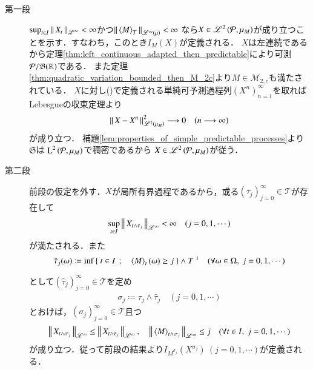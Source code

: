 	\begin{prf}\mbox{}
		\begin{description}
			\item[第一段] $\operatorname*{sup}_{t \in I} \left\|\, X_t\, \right\|_{\mathscr{L}^\infty} < \infty$かつ$\Norm{\inprod<M>_T}{\semiLp{\infty}{\mu}} < \infty$
				なら$X \in \mathscr{L}^{2} \left(\mathcal{P},\mu_M\right)$が成り立つことを示す．すなわち，このとき$I_M(X)$が定義される．
				$X$は左連続であるから定理\ref{thm:left_continuous_adapted_then_predictable}により可測$\mathcal{P}/\mathfrak{B}(\mathbb{R})$である．
				また定理\ref{thm:quadratic_variation_bounded_then_M_2c}より$M \in \mathcal{M}_{2,c}$も満たされている．
				$X$に対し()で定義される単純可予測過程列$(X^n)_{n=1}^{\infty}$を取れば
				Lebesgueの収束定理より
				\begin{align}
					\left\|\, X - X^n\, \right\|_{\mathscr{L}^{2} \left(\mu_M\right)}^2 \longrightarrow 0 
					\quad (n \longrightarrow \infty)
				\end{align}
				が成り立つ．
				補題\ref{lem:properties_of_simple_predictable_processes}より$\mathfrak{S}$は
				$\operatorname{L}^{2} \left(\mathcal{P},\mu_M\right)$で稠密であるから
				$X \in \mathscr{L}^{2} \left(\mathcal{P},\mu_M\right)$が従う．
				
			\item[第二段]
				前段の仮定を外す．$X$が局所有界過程であるから，或る$(\tau_j)_{j=0}^{\infty} \in \mathcal{T}$が存在して
				\begin{align}
					\operatorname*{sup}_{t \in I} \left\|\, X_{t \wedge \tau_j}\, \right\|_{\mathscr{L}^\infty} < \infty
					\quad (j=0,1,\cdots)
				\end{align}
				が満たされる．また
				\begin{align}
					\hat{\tau}_j(\omega) \coloneqq
					\inf{}{\Set{t \in I}{\inprod<M>_t(\omega) \geq j}} \wedge T\ \footnotemark
					\quad (\forall \omega \in \Omega,\ j=0,1,\cdots)
				\end{align}
				として$\left( \hat{\tau}_j \right)_{j=0}^{\infty} \in \mathcal{T}$を定め
				\begin{align}
					\sigma_j \coloneqq \tau_j \wedge \hat{\tau}_j
					\quad (j=0,1,\cdots)
				\end{align}
				とおけば，$(\sigma_j)_{j=0}^{\infty} \in \mathcal{T}$且つ
				\begin{align}
					\Norm{X_{t \wedge \sigma_j}}{\mathscr{L}^\infty} \leq \Norm{X_{t \wedge \tau_j}}{\mathscr{L}^\infty},
					\quad \Norm{\inprod<M>_{t \wedge \sigma_j}}{\mathscr{L}^\infty} \leq j
					\quad (\forall t \in I,\ j=0,1,\cdots)
				\end{align}
				が成り立つ．従って前段の結果より$I_{M^{\sigma_j}}(X^{\sigma_j})\ (j=0,1,\cdots)$が定義される．
				

\end{description}
\end{prf}
